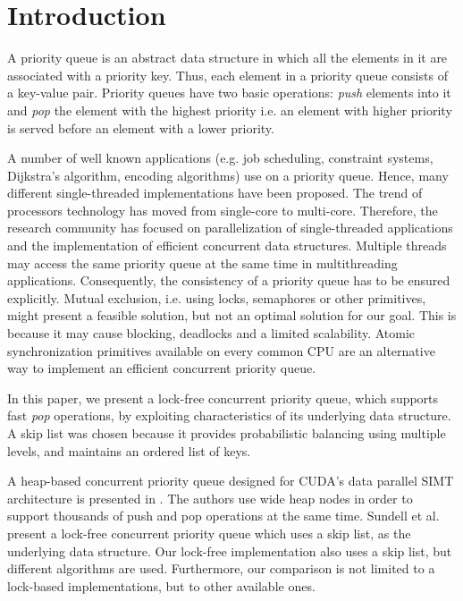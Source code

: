 \section{Introduction}\label{sec:intro}

A priority queue is an abstract data structure in which all the elements in it are associated with a priority key.
Thus, each element in a priority queue consists of a key-value pair.
Priority queues have two basic operations: \textit{push} elements into it and \textit{pop} the element with the highest priority i.e. an element with higher priority is served before an element with a lower priority.

A number of well known applications (e.g. job scheduling, constraint systems, Dijkstra's algorithm, encoding algorithms) use on a priority queue.
Hence, many different single-threaded implementations have been proposed.
The trend of processors technology has moved from single-core to multi-core.
Therefore, the research community has focused on parallelization of single-threaded applications and the implementation of efficient concurrent data structures.
Multiple threads may access the same priority queue at the same time in multithreading applications.
Consequently, the consistency of a priority queue has to be ensured explicitly.
Mutual exclusion, i.e. using locks, semaphores or other primitives, might present a feasible solution, but not an optimal solution for our goal. This is because  it may cause blocking, deadlocks and a limited scalability.
Atomic synchronization primitives available on every common CPU are an alternative way to implement an efficient concurrent priority queue.

In this paper, we present a lock-free concurrent priority queue, which supports fast \textit{pop} operations, by exploiting characteristics of its underlying data structure. A skip list \cite{Pugh:1990:SLP:78973.78977} was chosen because it provides probabilistic balancing using multiple levels, and maintains an ordered list of keys.

A heap-based concurrent priority queue designed for CUDA's data parallel SIMT architecture is presented in \cite{DBLP:conf/hipc/HeAP12}.
The authors use wide heap nodes in order to support thousands of push and pop operations at the same time.
Sundell et al.~\cite{Sundell:2005:FLC:1073765.1073770} present a lock-free concurrent priority queue which uses a skip list, as the underlying data structure.
Our lock-free implementation also uses a skip list, but different algorithms are used. Furthermore, our comparison is not limited to a lock-based implementations, but to other available ones. 

